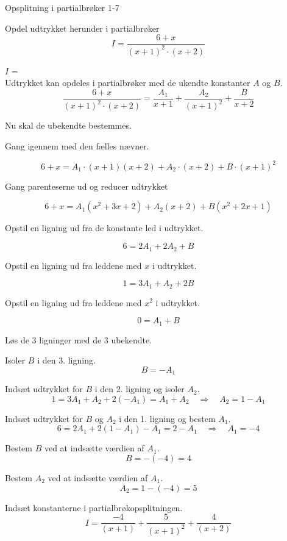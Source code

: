 \documentclass{article}
\begin{document}
\begin{exercise}{Opsplitning i partialbrøker 1-7}
	
	Opdel udtrykket herunder i partialbrøker
	\[
	I = \frac{6 + x}{(x + 1)^2 \cdot (x + 2)}
	\]
	
	$I$ =  \\
	
	\hint
	Udtrykket kan opdeles i partialbrøker med de ukendte konstanter $A$ og $B$.
	\[
	\frac{6 + x}{(x + 1)^2 \cdot (x + 2)} = 
	\frac{A_1}{x + 1} + \frac{A_2}{(x+1)^2} + \frac{B}{x + 2}
	\]
	
	\hint
	Nu skal de ubekendte bestemmes.
	
	\hint
	Gang igennem med den fælles nævner.
	
	\hint
	\[
	6 + x = A_1 \cdot (x + 1)(x+2) + A_2 \cdot (x+2)  + B \cdot (x + 1)^2
	\]
	
	\hint
	Gang parenteserne ud og reducer udtrykket
	
	\hint
	\[
	6 + x = A_1(x^2 + 3x + 2) + A_2(x+2) + B(x^2 + 2x + 1)
	\]
	
	\hint
	Opstil en ligning ud fra de konstante led i udtrykket.
	
	\hint
	\[
	6 = 2A_1 + 2A_2 + B
	\]
	
	\hint
	Opstil en ligning ud fra leddene med $x$ i udtrykket.
	
	\hint
	\[
	1 = 3A_1 + A_2 + 2B
	\]
		
	\hint
	Opstil en ligning ud fra leddene med $x^2$ i udtrykket.
	
	\hint
	\[
	0 = A_1 + B
	\]
	
	\hint
	Løs de 3 ligninger med de 3 ubekendte.
	
	\hint
	Isoler $B$ i den 3. ligning.
	\[
	B  =  -A_1
	\]
	
	\hint
	Indsæt udtrykket for $B$ i den 2. ligning og isoler $A_2$.
	\[
	1 = 3A_1 + A_2 + 2(-A_1) = A_1 + A_2 \quad	\Rightarrow 	\quad A_2 = 1 - A_1
	\]
	
	\hint
	Indsæt udtrykket for $B$ og $A_2$ i den 1. ligning og bestem $A_1$.
	\[
	6 = 2 A_1 + 2(1-A_1) -A_1 = 2 - A_1		\quad 	\Rightarrow 		\quad A_1 = -4
	 \]
	
	\hint
	Bestem $B$ ved at indsætte værdien af $A_1$.
	\[
	B = - (-4) = 4 
	\]
	
	\hint
	Bestem $A_2$ ved at indsætte værdien af $A_1$.
	\[
	A_2 = 1 - (-4) = 5
	\]
	
	\hint
	Indsæt konstanterne i partialbrøkopsplitningen.
	\[
	I = \frac{-4}{(x+1)} + \frac{5}{(x+1)^2} + \frac{4}{(x+2)}
	\]
	
	
	
\end{exercise}
\end{document}

